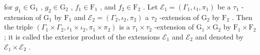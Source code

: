 for \(g_{1} \in \mathrm{G}_{1}\) , \(g_{2} \in \mathrm{G}_{2}\) , \(f_{1} \in \mathrm{F}_{1}\) , and \(f_{2} \in \mathrm{F}_{2}\) . Let \(\mathcal{E}_1 = (\Gamma_1, \iota_1, \pi_1)\) be a \(\tau_1\) -extension of \(\mathrm{G}_1\) by \(\mathrm{F}_1\) and \(\mathcal{E}_2 = (\Gamma_2, \iota_2, \pi_2)\) a \(\tau_2\) -extension of \(\mathrm{G}_2\) by \(\mathrm{F}_2\) . Then the triple \((\Gamma_1 \times \Gamma_2, \iota_1 \times \iota_2, \pi_1 \times \pi_2)\) is a \(\tau_1 \times \tau_2\) -extension of \(\mathrm{G}_1 \times \mathrm{G}_2\) by \(\mathrm{F}_1 \times \mathrm{F}_2\) ; it is called the exterior product of the extensions \(\mathcal{E}_1\) and \(\mathcal{E}_2\) and denoted by \(\mathcal{E}_1 \times \mathcal{E}_2\) .

